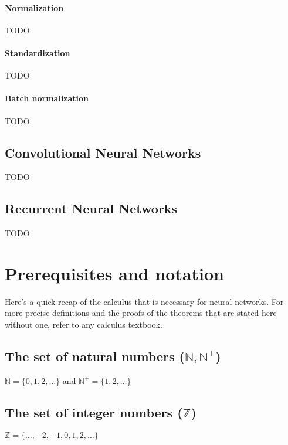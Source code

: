 \documentclass[titlepage]{article}
\begin{document}
        \paragraph{Normalization}

          TODO

        \paragraph{Standardization}

          TODO

        \paragraph{Batch normalization}

          TODO

\newpage

    \subsection{Convolutional Neural Networks}

      TODO

\newpage

    \subsection{Recurrent Neural Networks}

      TODO

\newpage

  \appendix

    \section{Prerequisites and notation}

      Here's a quick recap of the calculus that is necessary for neural
      networks. For more precise definitions and the proofs of the theorems that
      are stated here without one, refer to any calculus textbook.

      \subsection{The set of natural numbers ($\mathbb{N}, \mathbb{N}^+$)}
        $\mathbb{N} = \{ 0, 1, 2, \ldots \}$ and
        $\mathbb{N}^+ = \{ 1, 2, \ldots \}$

      \subsection{The set of integer numbers ($\mathbb{Z}$)}
        $\mathbb{Z} = \{ \ldots, -2, -1, 0, 1, 2, \ldots \}$
\end{document}
